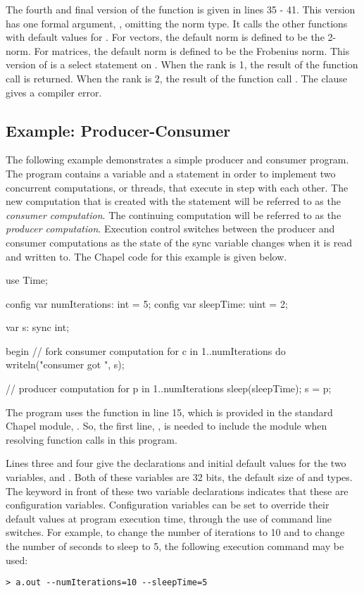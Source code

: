 The fourth and final version of the  function is given in lines
35 - 41.  This version has one formal argument, , omitting the norm
type.  It calls the other  functions with default values for 
.  For vectors, the default norm is defined to be the 2-norm.
For matrices, the default norm is defined to be the Frobenius norm.  This 
version of  is a select statement on .  When the rank 
is 1, the result of the function call  is returned.  
When the rank is 2, the result of the function call . 
The  clause gives a compiler error.

\subsection{Example: Producer-Consumer}
The following example demonstrates a simple producer and consumer program.
The program contains a  variable and a  statement 
in order to implement two concurrent computations, or threads, that execute 
in step with each other.
The new computation that is created with the  statement will 
be referred to as the {\em consumer computation}.  The continuing computation
will be referred to as the
{\em producer computation}.  Execution control switches between the
producer and consumer computations as the state of the sync variable  
changes when it is read and written to.  The Chapel code for this example is given below.

\begin{numberedchapel}
use Time;

config var numIterations: int = 5;
config var sleepTime: uint = 2;

var s: sync int;

begin {  // fork consumer computation
  for c in 1..numIterations do
    writeln("consumer got ", s);
}

// producer computation
for p in 1..numIterations {
  sleep(sleepTime);
  s = p;
}
\end{numberedchapel}

The program uses the  function in line 15, which is provided in the
standard Chapel module, .  So, the first line, , 
is needed to include the  module when resolving 
function calls in this program.  

Lines three and four give the declarations and initial default values
for the two variables,  and .
Both of these variables are 32 bits, the default size of  and  types.
The  keyword in front of these two variable declarations 
indicates that these are configuration variables.  Configuration variables 
can be set to override their default values at program execution time, through the 
use of command line switches.  For example, to change the number of iterations to 10
and to change the number of seconds to sleep to 5, the following execution command 
may be used:
\begin{verbatim}
> a.out --numIterations=10 --sleepTime=5
\end{verbatim}

